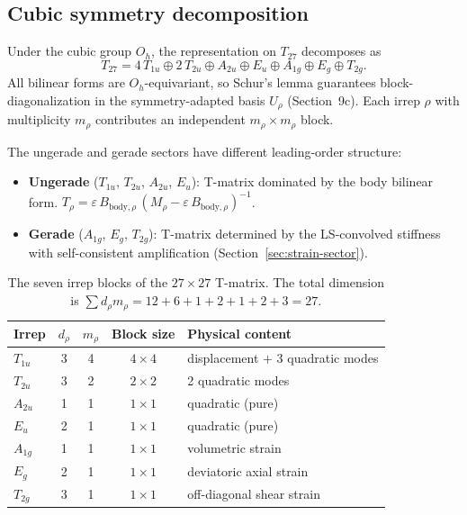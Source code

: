 \subsection{Cubic symmetry decomposition}

Under the cubic group $O_h$, the representation on $T_{27}$ decomposes as
\begin{equation}
  T_{27} = 4\,T_{1u} \oplus 2\,T_{2u} \oplus A_{2u} \oplus E_u
           \oplus A_{1g} \oplus E_g \oplus T_{2g}.
  \label{eq:Oh-decomp}
\end{equation}
All bilinear forms are $O_h$-equivariant, so Schur's lemma guarantees
block-diagonalization in the symmetry-adapted basis $U_\rho$
(Section~9c).  Each irrep $\rho$ with multiplicity $m_\rho$ contributes
an independent $m_\rho \times m_\rho$ block.

The ungerade and gerade sectors have different leading-order structure:
\begin{itemize}
\item \textbf{Ungerade} ($T_{1u}$, $T_{2u}$, $A_{2u}$, $E_u$):
  T-matrix dominated by the body bilinear form.
  $T_\rho = \varepsilon\,B_{\text{body},\rho}\,
  (M_\rho - \varepsilon\,B_{\text{body},\rho})^{-1}$.
\item \textbf{Gerade} ($A_{1g}$, $E_g$, $T_{2g}$):
  T-matrix determined by the LS-convolved stiffness with
  self-consistent amplification (Section~\ref{sec:strain-sector}).
\end{itemize}

\begin{table}[h]
\centering
\begin{tabular}{lcccl}
\toprule
Irrep & $d_\rho$ & $m_\rho$ & Block size & Physical content \\
\midrule
$T_{1u}$ & 3 & 4 & $4\times 4$ & displacement $+$ 3 quadratic modes \\
$T_{2u}$ & 3 & 2 & $2\times 2$ & 2 quadratic modes \\
$A_{2u}$ & 1 & 1 & $1\times 1$ & quadratic (pure) \\
$E_u$    & 2 & 1 & $1\times 1$ & quadratic (pure) \\
$A_{1g}$ & 1 & 1 & $1\times 1$ & volumetric strain \\
$E_g$    & 2 & 1 & $1\times 1$ & deviatoric axial strain \\
$T_{2g}$ & 3 & 1 & $1\times 1$ & off-diagonal shear strain \\
\bottomrule
\end{tabular}
\caption{The seven irrep blocks of the $27\times 27$ T-matrix.
The total dimension is $\sum d_\rho m_\rho = 12 + 6 + 1 + 2 + 1 + 2 + 3 = 27$.}
\label{tab:irrep-blocks}
\end{table}


